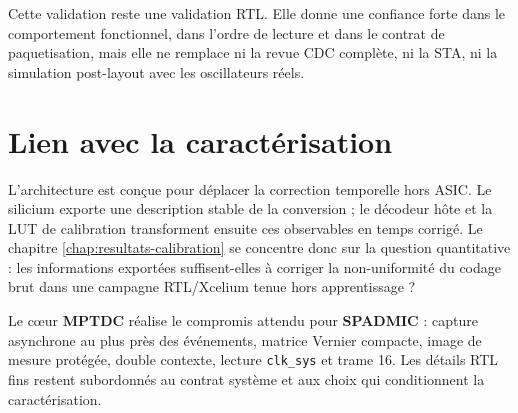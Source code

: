 Cette validation reste une validation RTL. Elle donne une confiance forte dans le comportement fonctionnel, dans l'ordre de lecture et dans le contrat de paquetisation, mais elle ne remplace ni la revue CDC complète, ni la STA, ni la simulation post-layout avec les oscillateurs réels.

\section{Lien avec la caractérisation}

L'architecture est conçue pour déplacer la correction temporelle hors ASIC. Le silicium exporte une description stable de la conversion ; le décodeur hôte et la LUT de calibration transforment ensuite ces observables en temps corrigé. Le chapitre \ref{chap:resultats-calibration} se concentre donc sur la question quantitative : les informations exportées suffisent-elles à corriger la non-uniformité du codage brut dans une campagne RTL/Xcelium tenue hors apprentissage ?

\begin{summaryBox}
Le cœur \textbf{MPTDC} réalise le compromis attendu pour \textbf{SPADMIC} : capture asynchrone au plus près des événements, matrice Vernier compacte, image de mesure protégée, double contexte, lecture \texttt{clk\_sys} et trame \SI{16}{\bit}. Les détails RTL fins restent subordonnés au contrat système et aux choix qui conditionnent la caractérisation.
\end{summaryBox}

\clearpage
